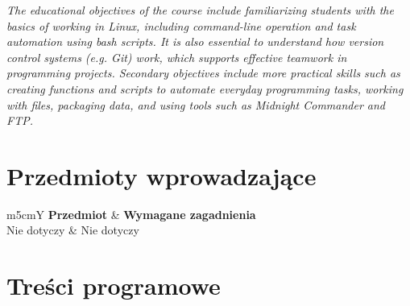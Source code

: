 \documentclass[12pt, a4paper]{article}
\newcommand{\thdrule}{\noalign{\global\setlength{\extrarowheight}{0pt}}}
\newcommand{\thdend}{\noalign{\global\setlength{\extrarowheight}{3pt}}}
\begin{document}
\textit{The educational objectives of the course include familiarizing students with the basics of working in Linux, including command-line operation and task automation using bash scripts. It is also essential to understand how version control systems (e.g. Git) work, which supports effective teamwork in programming projects. Secondary objectives include more practical skills such as creating functions and scripts to automate everyday programming tasks, working with files, packaging data, and using tools such as Midnight Commander and FTP.}


\section{Przedmioty wprowadzające}

{\scriptsize
\begin{tabularx}{\textwidth}{m{5cm}Y}
\thdrule\toprule
{} {\color{white}\textbf{Przedmiot}} & {\color{white}\textbf{Wymagane zagadnienia}} \\
\midrule\thdend
   Nie dotyczy & Nie dotyczy \\
\bottomrule
\end{tabularx}}

\section{Treści programowe}
\end{document}
